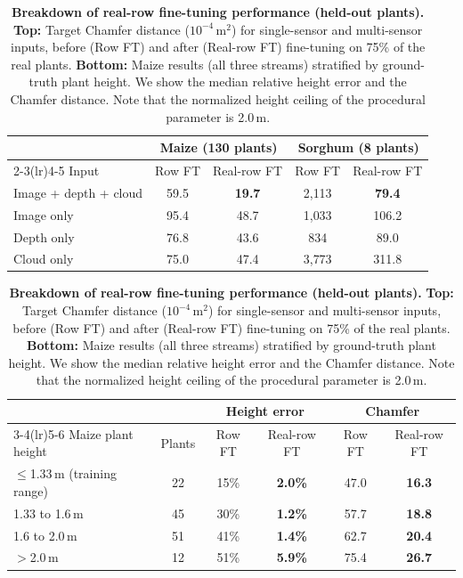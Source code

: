 \documentclass[10pt,twocolumn,letterpaper]{article}
\begin{document}
\begin{table}[t]
  \caption{\textbf{Breakdown of real-row fine-tuning performance (held-out plants).} \textbf{Top:} Target Chamfer distance ($10^{-4}$\,m$^2$) for single-sensor and multi-sensor inputs, before (Row FT) and after (Real-row FT) fine-tuning on 75\% of the real plants. \textbf{Bottom:} Maize results (all three streams) stratified by ground-truth plant height. We show the median relative height error and the Chamfer distance. Note that the normalized height ceiling of the procedural parameter is 2.0\,m.}
  \label{tab:e10_detail}
  \centering\scriptsize
  \setlength{\tabcolsep}{3pt}
  {%
  \begin{tabular}{l cc cc}
    \toprule
    & \multicolumn{2}{c}{Maize (130 plants)} & \multicolumn{2}{c}{Sorghum (8 plants)} \\
    \cmidrule(lr){2-3}\cmidrule(lr){4-5}
    Input & Row FT & Real-row FT & Row FT & Real-row FT \\
    \midrule
    Image + depth + cloud & 59.5 & \textbf{19.7} & 2{,}113 & \textbf{79.4} \\
    Image only & 95.4 & 48.7 & 1{,}033 & 106.2 \\
    Depth only & 76.8 & 43.6 & 834 & 89.0 \\
    Cloud only & 75.0 & 47.4 & 3{,}773 & 311.8 \\
    \bottomrule
  \end{tabular}}

  \vspace{4pt}
  {%
  \begin{tabular}{l c cc cc}
    \toprule
    & & \multicolumn{2}{c}{Height error} & \multicolumn{2}{c}{Chamfer} \\
    \cmidrule(lr){3-4}\cmidrule(lr){5-6}
    Maize plant height & Plants & Row FT & Real-row FT & Row FT & Real-row FT \\
    \midrule
    $\le$1.33\,m (training range) & 22 & 15\% & \textbf{2.0\%} & 47.0 & \textbf{16.3} \\
    1.33 to 1.6\,m & 45 & 30\% & \textbf{1.2\%} & 57.7 & \textbf{18.8} \\
    1.6 to 2.0\,m & 51 & 41\% & \textbf{1.4\%} & 62.7 & \textbf{20.4} \\
    $>$2.0\,m & 12 & 51\% & \textbf{5.9\%} & 75.4 & \textbf{26.7} \\
    \bottomrule
  \end{tabular}}
\end{table}
\end{document}
